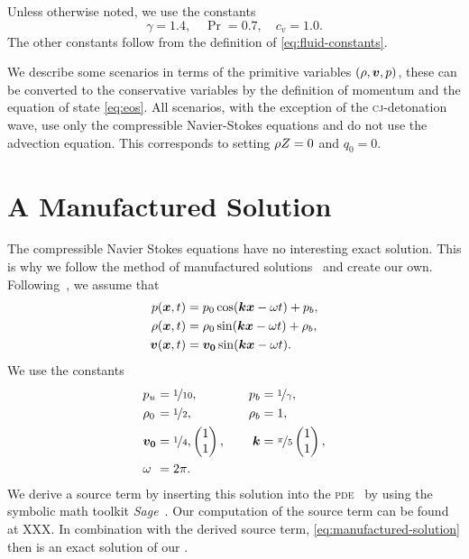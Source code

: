 Unless otherwise noted, we use the constants
\begin{equation}
  \gamma = 1.4, \quad \Pr = 0.7, \quad c_v = 1.0.
\end{equation}
The other constants follow from the definition of \cref{eq:fluid-constants}.

We describe some scenarios in terms of the primitive variables $(\rho, \bm{v}, p)$, these can be converted to the conservative variables by the definition of momentum and the equation of state \cref{eq:eos}.
All scenarios, with the exception of the \textsc{cj}-detonation wave, use only the compressible Navier-Stokes equations and do not use the advection equation.
This corresponds to setting $\rho Z = 0$ and $q_0 = 0$.

\section{A Manufactured Solution}\label{sec:manufactured-solution}
The compressible Navier Stokes equations have no interesting exact solution.
This is why we follow the method of manufactured solutions~\cite{salari2000code} and create our own.
Following~\cite{dumbser2010arbitrary}, we assume that
\begin{align}\label{eq:manufactured-solution}
\begin{split}
  p(\bm{x}, t) &= p_0 \cos( \bm{k} \bm{x} - \omega t ) + p_b, \\
  \rho(\bm{x}, t) &= \rho_0 \sin (\bm{k} \bm{x} - \omega t) + \rho_b, \\
  \bm{v}(\bm{x}, t) &= \bm{v_0} \sin(\bm{k} \bm{x} - \omega t).
\end{split}
\end{align}
We use the constants
\begin{equation}
\begin{alignedat}{6}
  & p_u &&= \nicefrac{1}{10}, \qquad& p_b &= \nicefrac{1}{\gamma}, \\
  & \rho_0 &&= \nicefrac{1}{2}, \qquad& \rho_b &= 1, \\
  & \bm{v_0} &&= \nicefrac{1}{4},
  \begin{pmatrix}
    1 \\
    1
  \end{pmatrix},
  \qquad& \bm{k} &= \nicefrac{\pi}{5}
  \begin{pmatrix}
    1\\
    1
  \end{pmatrix},\\
  & \omega &&= 2 \pi.
  \end{alignedat}
\end{equation}
We derive a source term by inserting this solution into the \textsc{pde}~ by using the symbolic math toolkit \textit{Sage}~\cite{sagemath}.
Our computation of the source term can be found at XXX.
In combination with the derived source term, \cref{eq:manufactured-solution} then is an exact solution of our \pde{}.

